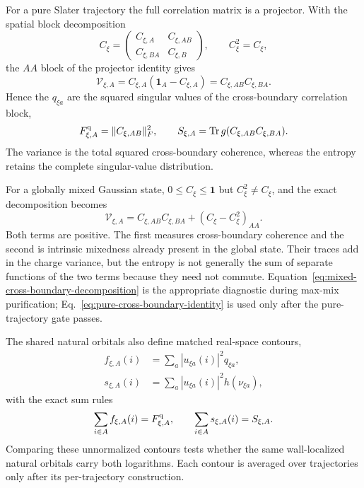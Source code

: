 \documentclass[aps,prx,twocolumn,floatfix,nofootinbib,superscriptaddress,longbibliography]{revtex4-2}
\newcommand{\qTr}{\operatorname{Tr}}
\begin{document}
For a pure Slater trajectory the full correlation matrix is a projector.  With the spatial
block decomposition
\begin{equation}
 C_\xi=
 \begin{pmatrix}
 C_{\xi,A}&C_{\xi,AB}\\
 C_{\xi,BA}&C_{\xi,B}
 \end{pmatrix},
 \qquad C_\xi^2=C_\xi,
\end{equation}
the $AA$ block of the projector identity gives
\begin{equation}
 \mathcal V_{\xi,A}
 =C_{\xi,A}(\mathbf{1}_A-C_{\xi,A})
 =C_{\xi,AB}C_{\xi,BA}.
 \label{eq:pure-cross-boundary-identity}
\end{equation}
Hence the $q_{\xi a}$ are the squared singular values of the cross-boundary correlation
block,
\begin{equation}
 F_{\xi,A}^{\rm q}=\|C_{\xi,AB}\|_F^2,
 \qquad
 S_{\xi,A}=\qTr g(C_{\xi,AB}C_{\xi,BA}).
 \label{eq:cross-boundary-spectral-functionals}
\end{equation}
The variance is the total squared cross-boundary coherence, whereas the entropy retains
the complete singular-value distribution.

For a globally mixed Gaussian state, $0\leq C_\xi\leq\mathbf{1}$ but $C_\xi^2\ne C_\xi$, and the
exact decomposition becomes
\begin{equation}
 \mathcal V_{\xi,A}
 =C_{\xi,AB}C_{\xi,BA}+(C_\xi-C_\xi^2)_{AA}.
 \label{eq:mixed-cross-boundary-decomposition}
\end{equation}
Both terms are positive.  The first measures cross-boundary coherence and the second is
intrinsic mixedness already present in the global state.  Their traces add in the charge
variance, but the entropy is not generally the sum of separate functions of the two terms
because they need not commute.  Equation~\eqref{eq:mixed-cross-boundary-decomposition} is
the appropriate diagnostic during max-mix purification; Eq.~\eqref{eq:pure-cross-boundary-identity}
is used only after the pure-trajectory gate passes.

The shared natural orbitals also define matched real-space contours,
\begin{equation}
 \begin{aligned}
 f_{\xi,A}(i)&=\sum_a|u_{\xi a}(i)|^2q_{\xi a},\\
 s_{\xi,A}(i)&=\sum_a|u_{\xi a}(i)|^2h(\nu_{\xi a}),
 \end{aligned}
 \label{eq:matched-entropy-variance-contours}
\end{equation}
with the exact sum rules
\begin{equation}
 \sum_{i\in A}f_{\xi,A}(i)=F_{\xi,A}^{\rm q},
 \qquad
 \sum_{i\in A}s_{\xi,A}(i)=S_{\xi,A}.
 \label{eq:matched-contour-sum-rules}
\end{equation}
Comparing these unnormalized contours tests whether the same wall-localized natural
orbitals carry both logarithms.  Each contour is averaged over trajectories only after its
per-trajectory construction.
\end{document}
